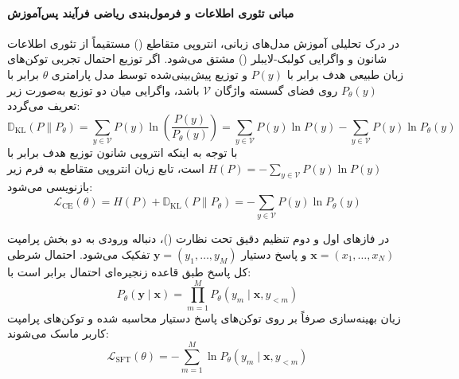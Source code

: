 \paragraph*{مبانی تئوری اطلاعات و فرمول‌بندی ریاضی فرآیند پس‌آموزش}
در درک تحلیلی آموزش مدل‌های زبانی، انتروپی متقاطع () مستقیماً از تئوری اطلاعات شانون و واگرایی کولبک-لایبلر () مشتق می‌شود. اگر توزیع احتمال تجربی توکن‌های زبان طبیعی هدف برابر با $P(y)$ و توزیع پیش‌بینی‌شده توسط مدل پارامتری $\theta$ برابر با $P_\theta(y)$ روی فضای گسسته واژگان $\mathcal{V}$ باشد، واگرایی  میان دو توزیع به‌صورت زیر تعریف می‌گردد:
\begin{equation}
    \mathbb{D}_{\text{KL}}(P \parallel P_\theta) = \sum_{y \in \mathcal{V}} P(y) \ln \left( \frac{P(y)}{P_\theta(y)} \right) = \sum_{y \in \mathcal{V}} P(y) \ln P(y) - \sum_{y \in \mathcal{V}} P(y) \ln P_\theta(y)
\end{equation}
با توجه به اینکه انتروپی شانون توزیع هدف برابر با $H(P) = - \sum_{y \in \mathcal{V}} P(y) \ln P(y)$ است، تابع زیان انتروپی متقاطع به فرم زیر بازنویسی می‌شود:
\begin{equation}
    \mathcal{L}_{\text{CE}}(\theta) = H(P) + \mathbb{D}_{\text{KL}}(P \parallel P_\theta) = - \sum_{y \in \mathcal{V}} P(y) \ln P_\theta(y)
\end{equation}

در فازهای اول و دوم تنظیم دقیق تحت نظارت ()، دنباله ورودی به دو بخش پرامپت $\mathbf{x} = (x_1, \dots, x_N)$ و پاسخ دستیار $\mathbf{y} = (y_1, \dots, y_M)$ تفکیک می‌شود. احتمال شرطی کل پاسخ طبق قاعده زنجیره‌ای احتمال برابر است با:
\begin{equation}
    P_\theta(\mathbf{y} \mid \mathbf{x}) = \prod_{m=1}^{M} P_\theta(y_m \mid \mathbf{x}, y_{<m})
\end{equation}
زیان بهینه‌سازی صرفاً بر روی توکن‌های پاسخ دستیار محاسبه شده و توکن‌های پرامپت کاربر ماسک می‌شوند:
\begin{equation}
    \mathcal{L}_{\text{SFT}}(\theta) = - \sum_{m=1}^{M} \ln P_\theta(y_m \mid \mathbf{x}, y_{<m})
\end{equation}

